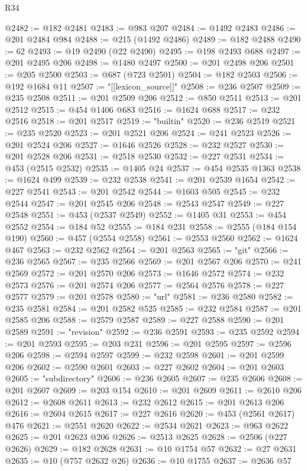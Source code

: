 \begin{lexlean}{R34}
\begin{coremodule}
@2482 := @182 @2481
@2483 := @983 @207
@2484 := @1492 @2483
@2486 := @201 @2484 @984
@2488 := @215 (@1492 @2486)
@2489 := @182 @2488
@2490 := 62
@2493 := @19 @2490 (@22 @2490)
@2495 := @198 @2493 @688
@2497 := @201 @2495 @206
@2498 := @1480 @2497
@2500 := @201 @2498 @206
@2501 := @205 @2500
@2503 := @687 (@723 @2501)
@2504 := @182 @2503
@2506 := @192 @1684 @11
@2507 := "[[lexicon_source]]"
@2508 := @236 @2507
@2509 := @235 @2508
@2511 := @201 @2509 @206
@2512 := @850 @2511
@2513 := @201 @2512
@2515 := @454 @1406 @683
@2516 := @1624 @688
@2517 := @232 @2516
@2518 := @201 @2517
@2519 := "builtin"
@2520 := @236 @2519
@2521 := @235 @2520
@2523 := @201 @2521 @206
@2524 := @241 @2523
@2526 := @201 @2524 @206
@2527 := @1646 @2526
@2528 := @232 @2527
@2530 := @201 @2528 @206
@2531 := @2518 @2530
@2532 := @227 @2531
@2534 := @453 (@2515 @2532)
@2535 := @1405 @24
@2537 := @454 @2535 @1363
@2538 := @1624 @499
@2539 := @232 @2538
@2541 := @201 @2539 @1654
@2542 := @227 @2541
@2543 := @201 @2542
@2544 := @1603 @505
@2545 := @232 @2544
@2547 := @201 @2545 @206
@2548 := @2543 @2547
@2549 := @227 @2548
@2551 := @453 (@2537 @2549)
@2552 := @1405 @31
@2553 := @454 @2552
@2554 := @184 @52
@2555 := @184 @231
@2558 := @2555 (@184 @154 @190)
@2560 := @457 (@2554 @2558)
@2561 := @2553 @2560
@2562 := @1624 @467
@2563 := @232 @2562
@2564 := @201 @2563
@2565 := "git"
@2566 := @236 @2565
@2567 := @235 @2566
@2569 := @201 @2567 @206
@2570 := @241 @2569
@2572 := @201 @2570 @206
@2573 := @1646 @2572
@2574 := @232 @2573
@2576 := @201 @2574 @206
@2577 := @2564 @2576
@2578 := @227 @2577
@2579 := @201 @2578
@2580 := "url"
@2581 := @236 @2580
@2582 := @235 @2581
@2584 := @201 @2582 @525
@2585 := @232 @2584
@2587 := @201 @2585 @206
@2588 := @2579 @2587
@2589 := @227 @2588
@2590 := @201 @2589
@2591 := "revision"
@2592 := @236 @2591
@2593 := @235 @2592
@2594 := @201 @2593
@2595 := @203 @231
@2596 := @201 @2595
@2597 := @2596 @206
@2598 := @2594 @2597
@2599 := @232 @2598
@2601 := @201 @2599 @206
@2602 := @2590 @2601
@2603 := @227 @2602
@2604 := @201 @2603
@2605 := "subdirectory"
@2606 := @236 @2605
@2607 := @235 @2606
@2608 := @201 @2607
@2609 := @203 @154
@2610 := @201 @2609
@2611 := @2610 @206
@2612 := @2608 @2611
@2613 := @232 @2612
@2615 := @201 @2613 @206
@2616 := @2604 @2615
@2617 := @227 @2616
@2620 := @453 (@2561 @2617) @476
@2621 := @2551 @2620
@2622 := @2534 @2621
@2623 := @963 @2622
@2625 := @201 @2623 @206
@2626 := @2513 @2625
@2628 := @2506 (@227 @2626)
@2629 := @182 @2628
@2631 := @10 @1754 @57
@2632 := @27 @2631
@2635 := @10 (@757 @2632 @26)
@2636 := @10 @1755
@2637 := @2636 @57

\end{coremodule}
\end{lexlean}
